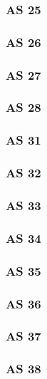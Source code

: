 \subsubsection{AS 25}

\subsubsection{AS 26}

\subsubsection{AS 27}

\subsubsection{AS 28}

\subsubsection{AS 31}

\subsubsection{AS 32}

\subsubsection{AS 33}

\subsubsection{AS 34}

\subsubsection{AS 35}

\subsubsection{AS 36}

\subsubsection{AS 37}

\subsubsection{AS 38}

